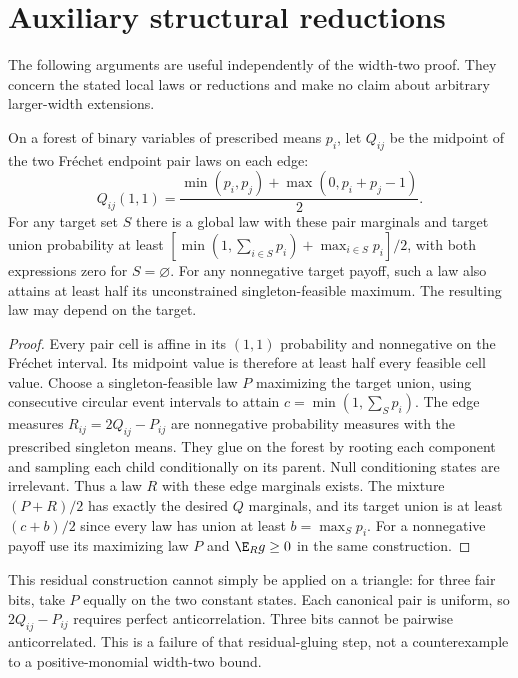 \section{Auxiliary structural reductions}\label{app:structural-auxiliary}
The following arguments are useful independently of the width-two proof.
They concern the stated local laws or reductions and make no claim about
arbitrary larger-width extensions.

\begin{lemma}\label{lem:canonical-pairs}
On a forest of binary variables of prescribed means $p_i$, let $Q_{ij}$
be the midpoint of the two Fr\'echet endpoint pair laws on each edge:
\[
 Q_{ij}(1,1)=\frac{\min(p_i,p_j)+\max(0,p_i+p_j-1)}2.
\]
For any target set $S$ there is a global law with these pair marginals
and target union probability at least
$[\min(1,\sum_{i\in S}p_i)+\max_{i\in S}p_i]/2$, with both expressions
zero for $S=\varnothing$. For any nonnegative target payoff, such a law
also attains at least half its unconstrained singleton-feasible maximum.
The resulting law may depend on the target.
\end{lemma}
\begin{proof}
Every pair cell is affine in its $(1,1)$ probability and nonnegative
on the Fr\'echet interval. Its midpoint value is therefore at least
half every feasible cell value. Choose a singleton-feasible law $P$
maximizing the target union, using consecutive circular event intervals
to attain $c=\min(1,\sum_Sp_i)$. The edge measures
$R_{ij}=2Q_{ij}-P_{ij}$ are nonnegative probability measures with the
prescribed singleton means. They glue on the forest by rooting each
component and sampling each child conditionally on its parent. Null
conditioning states are irrelevant. Thus a law $R$ with these edge
marginals exists. The mixture $(P+R)/2$ has exactly the desired $Q$
marginals, and its target union is at least $(c+b)/2$ since every law
has union at least $b=\max_Sp_i$. For a nonnegative payoff use its
maximizing law $P$ and $\E_Rg\ge0$ in the same construction.
\end{proof}
This residual construction cannot simply be applied on a triangle:
for three fair bits, take $P$ equally on the two constant states.
Each canonical pair is uniform, so $2Q_{ij}-P_{ij}$ requires perfect
anticorrelation. Three bits cannot be pairwise anticorrelated. This
is a failure of that residual-gluing step, not a counterexample to a
positive-monomial width-two bound.

